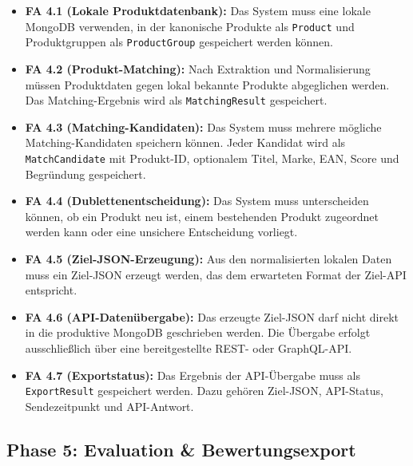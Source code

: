 \documentclass[11pt,a4paper]{article}
\begin{document}
\begin{itemize}[leftmargin=*]
    \item \textbf{FA 4.1 (Lokale Produktdatenbank):} Das System muss eine lokale MongoDB verwenden, in der kanonische Produkte als \texttt{Product} und Produktgruppen als \texttt{ProductGroup} gespeichert werden können.
    
    \item \textbf{FA 4.2 (Produkt-Matching):} Nach Extraktion und Normalisierung müssen Produktdaten gegen lokal bekannte Produkte abgeglichen werden. Das Matching-Ergebnis wird als \texttt{MatchingResult} gespeichert.
    
    \item \textbf{FA 4.3 (Matching-Kandidaten):} Das System muss mehrere mögliche Matching-Kandidaten speichern können. Jeder Kandidat wird als \texttt{MatchCandidate} mit Produkt-ID, optionalem Titel, Marke, EAN, Score und Begründung gespeichert.
    
    \item \textbf{FA 4.4 (Dublettenentscheidung):} Das System muss unterscheiden können, ob ein Produkt neu ist, einem bestehenden Produkt zugeordnet werden kann oder eine unsichere Entscheidung vorliegt.
    
    \item \textbf{FA 4.5 (Ziel-JSON-Erzeugung):} Aus den normalisierten lokalen Daten muss ein Ziel-JSON erzeugt werden, das dem erwarteten Format der Ziel-API entspricht.
    
    \item \textbf{FA 4.6 (API-Datenübergabe):} Das erzeugte Ziel-JSON darf nicht direkt in die produktive MongoDB geschrieben werden. Die Übergabe erfolgt ausschließlich über eine bereitgestellte REST- oder GraphQL-API.
    
    \item \textbf{FA 4.7 (Exportstatus):} Das Ergebnis der API-Übergabe muss als \texttt{ExportResult} gespeichert werden. Dazu gehören Ziel-JSON, API-Status, Sendezeitpunkt und API-Antwort.
\end{itemize}

\subsection{Phase 5: Evaluation \& Bewertungsexport}
\end{document}
